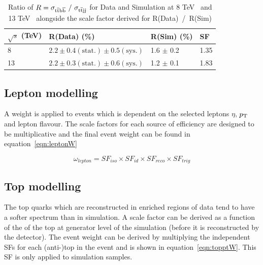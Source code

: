 \begin{table}[htpb!]
\footnotesize
\begin{center}
\begin{tabular}{|l|l|l|l|}
\hline
$\sqrt{s}$ (TeV)                         & R(Data)  (\%)                                                                             & R(Sim) (\%)       & SF   \\
\hline
8  & $2.2 \pm 0.4 \left( \textrm{stat.} \right) \pm 0.5 \left(\textrm{sys.} \right)$ & 1.6 $\pm$ 0.2 & 1.35 \\
13 & $2.2 \pm 0.3 \left( \textrm{stat.} \right) \pm 0.6 \left(\textrm{sys.} \right)$ & 1.2 $\pm$ 0.1 & 1.83 \\
\hline
\end{tabular}
\caption{Ratio of $R= \sigma_{\mathrm{t}\overline{\mathrm{t}}\mathrm{b}\overline{\mathrm{b}}}~/~ \sigma_{\mathrm{t}\overline{\mathrm{t}} \textrm{jj} }$ for Data and Simulation at 8 TeV~\cite{Khachatryan2015132} and 13 TeV~\cite{CMS-PAS-TOP-16-010} alongside the scale factor derived for R(Data)~/~R(Sim)}
\label{tab:heavyflavR}
\end{center}
\end{table}

\subsection{Lepton modelling}
A weight is applied to events which is dependent on the selected leptons $\eta$, $p_{\mathrm{T}}$ and lepton flavour. The scale factors for each source of efficiency are designed to be multiplicative and the final event weight can be found in equation~\ref{eqn:leptonW}

\begin{equation}
\omega_{lepton} = SF_{iso}\times SF_{id}\times SF_{reco}\times SF_{trig}
\label{eqn:leptonW}
\end{equation}

\subsection{Top \pt modelling}

The top quarks which are reconstructed in \ttbar enriched regions of data tend to have a softer \pt spectrum than in \ttbar simulation. A scale factor can be derived as a function of the \pt of the top at generator level of the simulation (before it is reconstructed by the detector). The event weight can be derived by multiplying the independent SFs for each (anti-)top in the event and is shown in equation~\ref{eqn:topptW}. This SF is only applied to \ttbar simulation samples.

